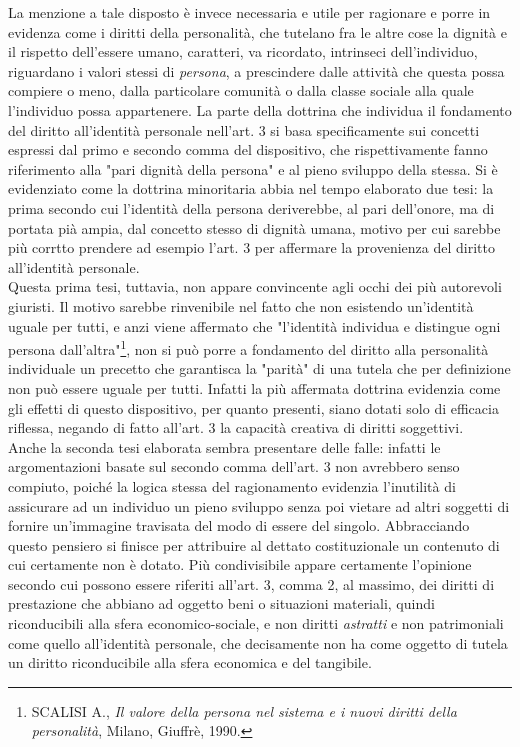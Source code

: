 La menzione a tale disposto è invece necessaria e utile per ragionare e porre in evidenza come i diritti della personalità, che tutelano fra le altre cose la dignità e il rispetto dell'essere umano, caratteri, va ricordato, intrinseci dell'individuo, riguardano i valori stessi di \textit{persona}, a prescindere dalle attività che questa possa compiere o meno, dalla particolare comunità o dalla classe sociale alla quale l'individuo possa appartenere.
La parte della dottrina che individua il fondamento del diritto all'identità personale nell'art. 3 si basa specificamente sui concetti espressi dal primo e secondo comma del dispositivo, che rispettivamente fanno riferimento alla "pari dignità della persona" e al pieno sviluppo della stessa.
Si è evidenziato come la dottrina minoritaria abbia nel tempo elaborato due tesi: la prima secondo cui l'identità della persona deriverebbe, al pari dell'onore, ma di portata pià ampia, dal concetto stesso di dignità umana, motivo per cui sarebbe più corrtto prendere ad esempio l'art. 3 per affermare la provenienza del diritto all'identità personale. \\Questa prima tesi, tuttavia, non appare convincente agli occhi dei più autorevoli giuristi. Il motivo sarebbe rinvenibile nel fatto che non esistendo un'identità uguale per tutti, e anzi viene affermato che "l'identità individua e distingue ogni persona dall'altra"\footnote{SCALISI A., \textit{Il valore della persona nel sistema e i nuovi diritti della personalità}, Milano, Giuffrè, 1990.}, non si può porre a fondamento del diritto alla personalità individuale un precetto che garantisca la "parità" di una tutela che per definizione non può essere uguale per tutti. Infatti la più affermata dottrina evidenzia come gli effetti di questo dispositivo, per quanto presenti, siano dotati solo di efficacia riflessa, negando di fatto all'art. 3 la capacità creativa di diritti soggettivi.
\\Anche la seconda tesi elaborata sembra presentare delle falle: infatti le argomentazioni basate sul secondo comma dell'art. 3 non avrebbero senso compiuto, poiché la logica stessa del ragionamento evidenzia l'inutilità di assicurare ad un individuo un pieno sviluppo senza poi vietare ad altri soggetti di fornire un'immagine travisata del modo di essere del singolo. Abbracciando questo pensiero si finisce per attribuire al dettato costituzionale un contenuto di cui certamente non è dotato. Più condivisibile appare certamente l'opinione secondo cui possono essere riferiti all'art. 3, comma 2, al massimo, dei diritti di prestazione che abbiano ad oggetto beni o situazioni materiali, quindi riconducibili alla sfera economico-sociale, e non diritti \textit{astratti} e non patrimoniali come quello all'identità personale, che decisamente non ha come oggetto di tutela un diritto riconducibile alla sfera economica e del tangibile.

